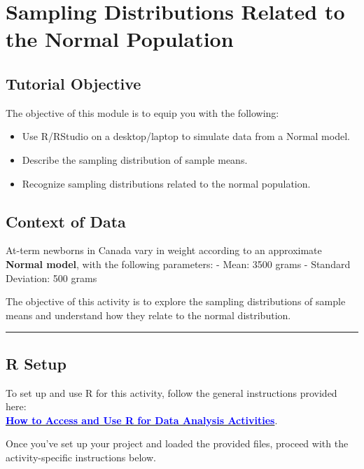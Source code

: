 \documentclass[oneside,openany]{book}
\begin{document}
\chapter{Sampling Distributions Related to the Normal Population}\label{activity-3---sampling-distributions-related-to-the-normal-population}

\section{Tutorial Objective}\label{tutorial-objective}

The objective of this module is to equip you with the following:
\begin{itemize}
    \item Use R/RStudio on a desktop/laptop to simulate data from a Normal model.
    \item Describe the sampling distribution of sample means.
    \item Recognize sampling distributions related to the normal population.
\end{itemize}


\section{Context of Data}\label{context-of-data-2}

At-term newborns in Canada vary in weight according to an approximate \textbf{Normal model}, with the following parameters:
- Mean: 3500 grams
- Standard Deviation: 500 grams

The objective of this activity is to explore the sampling distributions of sample means and understand how they relate to the normal distribution.

\begin{center}\rule{0.5\linewidth}{0.5pt}\end{center}

\section{R Setup}\label{r-setup-2}

To set up and use R for this activity, follow the general instructions provided here:\\
\hyperref[how-to-set-up-r-for-data-analysis-activities]{\textcolor{blue}{\textbf{How to Access and Use R for Data Analysis Activities}}}.

Once you've set up your project and loaded the provided files, proceed with the activity-specific instructions below.
\end{document}
